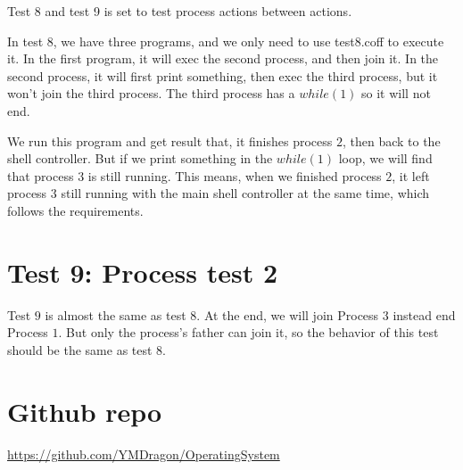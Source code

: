 \documentclass[11pt]{article}
\begin{document}
\begin{spacing}{1.1}
Test 8 and test 9 is set to test process actions between actions.

In test 8, we have three programs, and we only need to use test8.coff to execute it. In the first program, it will exec the second process, and then join it. In the second process, it will first print something, then exec the third process, but it won't join the third process. The third process has a $while(1)$ so it will not end.

We run this program and get result that, it finishes process $2$, then back to the shell controller. But if we print something in the $while(1)$ loop, we will find that process $3$ is still running. This means, when we finished process $2$, it left process $3$ still running with the main shell controller at the same time, which follows the requirements. 

\section{Test 9: Process test 2}

Test $9$ is almost the same as test $8$. At the end, we will join Process $3$ instead end Process $1$. But only the process's father can join it, so the behavior of this test should be the same as test $8$.

\section{Github repo}

\url{https://github.com/YMDragon/OperatingSystem}


\end{spacing}
\end{document}

